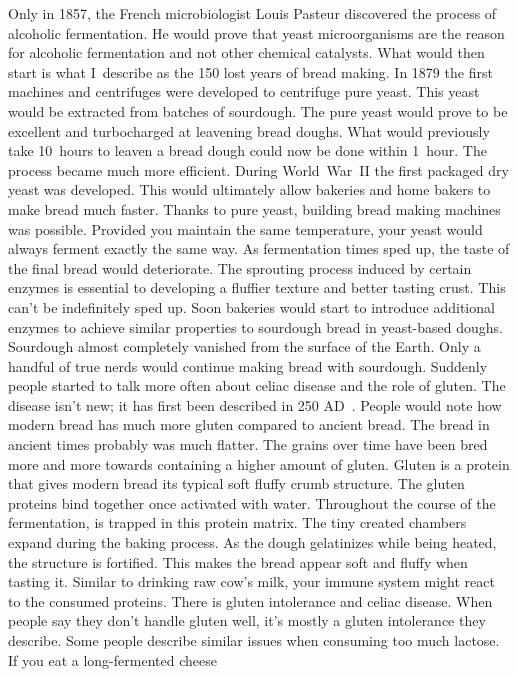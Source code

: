 Only in 1857, the French microbiologist Louis Pasteur discovered
the process of alcoholic fermentation. He would prove that
yeast microorganisms are the reason for alcoholic fermentation
and not other chemical catalysts. What would then start is
what I~describe as the 150 lost years of bread making. In 1879
the first machines and centrifuges were developed to centrifuge
pure yeast. This yeast would be extracted from batches of sourdough.
The pure yeast would prove to be excellent and turbocharged
at leavening bread doughs. What would previously take 10~hours
to leaven a bread dough could now be done within 1~hour.
The process became much more efficient. During World~War~II
the first packaged dry yeast was developed. This would ultimately
allow bakeries and home bakers to make bread much faster.
Thanks to pure yeast, building bread making machines was
possible. Provided you maintain the same temperature,
your yeast would always ferment exactly the same way. As fermentation
times sped up, the taste of the final bread would deteriorate.
The sprouting process induced by certain enzymes is essential
to developing a fluffier texture and better tasting crust. This
can't be indefinitely sped up. Soon bakeries would start
to introduce additional enzymes to achieve similar properties
to sourdough bread in yeast-based doughs. Sourdough almost completely
vanished from the surface of the Earth. Only a handful
of true nerds would continue making bread with sourdough.
Suddenly people started to talk more often about celiac disease
and the role of gluten. The disease isn't new; it has first
been described in 250 AD~\cite{coeliac+disease}. People
would note how modern bread has much more gluten compared
to ancient bread. The bread in ancient times probably was much flatter.
The grains over time have been bred more and more towards containing a higher
amount of gluten. Gluten is a protein that gives modern
bread its typical soft fluffy crumb structure. The
gluten proteins bind together once activated with water.
Throughout the course of the fermentation,  is trapped
in this protein matrix. The tiny created chambers expand
during the baking process. As the dough gelatinizes while
being heated, the structure is fortified. This makes the bread appear
soft and fluffy when tasting it. Similar to drinking raw cow's milk,
your immune system might react to the consumed proteins.
There is gluten intolerance
and celiac disease. When people say they don't handle
gluten well, it's mostly a gluten intolerance they describe.
Some people describe similar issues when consuming
too much lactose. If you eat a long-fermented cheese
